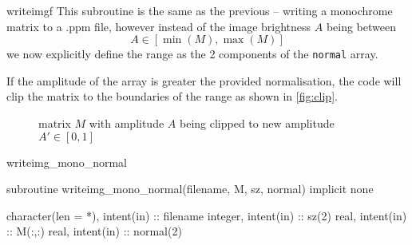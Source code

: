 \documentclass[a4paper]{article}
\begin{document}
\begin{codeblock}{writeimgf}
This subroutine is the same as the previous -- writing a monochrome matrix to a .ppm file, however instead of the image brightness $A$ being between 
\begin{equation*}
A \in [\min(M), \max(M)]
\end{equation*}
we now explicitly define the range as the 2 components of the \texttt{normal} array.

If the amplitude of the array is greater the provided normalisation, the code will clip the matrix to the boundaries of the range as shown in \autoref{fig:clip}.

\begin{figure}[hbt]
\centering
{}
\caption{matrix $M$ with amplitude $A$ being clipped to new amplitude $A' \in [0, 1]$}
\label{fig:clip}
\end{figure}

\begin{codeblock}[noindex]{writeimg_mono_normal}
\begin{code}
	subroutine writeimg_mono_normal(filename, M, sz, normal)
		implicit none

		character(len = *), intent(in) :: filename
		integer, intent(in) :: sz(2)
		real, intent(in) :: M(:,:)
		real, intent(in) :: normal(2)
		

\end{code}
\end{codeblock}
\end{codeblock}
\end{document}

